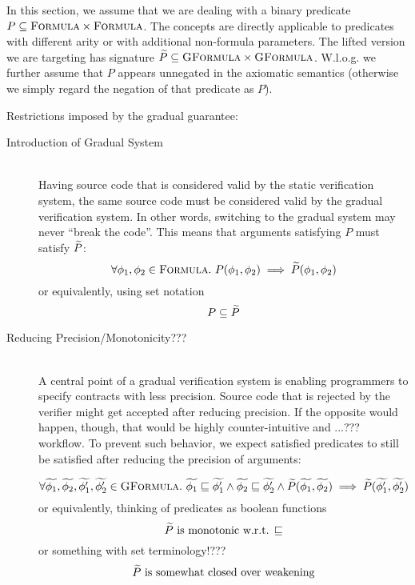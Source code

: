 
In this section, we assume that we are dealing with a binary predicate $P \subseteq \textsc{Formula} \times \textsc{Formula}$.
The concepts are directly applicable to predicates with different arity or with additional non-formula parameters.
The lifted version we are targeting has signature $\widetilde{P} \subseteq \textsc{GFormula} \times \textsc{GFormula}$.
W.l.o.g. we further assume that $P$ appears unnegated in the axiomatic semantics (otherwise we simply regard the negation of that predicate as $P$).

Restrictions imposed by the gradual guarantee:
\begin{description}
    \item[Introduction of Gradual System]~\\
    Having source code that is considered valid by the static verification system, the same source code must be considered valid by the gradual verification system.
    In other words, switching to the gradual system may never “break the code”.
    This means that arguments satisfying $P$ must satisfy $\widetilde{P}$:
    \begin{displaymath}
    \forall \phi_1, \phi_2 \in \textsc{Formula}.~ P(\phi_1, \phi_2) \implies \widetilde{P}(\phi_1, \phi_2)
    \end{displaymath}
    or equivalently, using set notation
    \begin{displaymath}
    P \subseteq \widetilde{P}
    \end{displaymath}
    
    \item[Reducing Precision/Monotonicity???]~\\
    A central point of a gradual verification system is enabling programmers to specify contracts with less precision.
    Source code that is rejected by the verifier might get accepted after reducing precision.
    If the opposite would happen, though, that would be highly counter-intuitive and ...??? workflow.
    To prevent such behavior, we expect satisfied predicates to still be satisfied after reducing the precision of arguments:
    
    \begin{displaymath}
    \forall \widetilde{\phi_1}, \widetilde{\phi_2}, \widetilde{\phi_1'}, \widetilde{\phi_2'} \in \textsc{GFormula}.~ \widetilde{\phi_1} \sqsubseteq \widetilde{\phi_1'} \wedge \widetilde{\phi_2} \sqsubseteq \widetilde{\phi_2'} \wedge \widetilde{P}(\widetilde{\phi_1}, \widetilde{\phi_2}) \implies \widetilde{P}(\widetilde{\phi_1'}, \widetilde{\phi_2'})
    \end{displaymath}
    or equivalently, thinking of predicates as boolean functions
    \begin{displaymath}
    \widetilde{P}  \text{ is monotonic w.r.t. $\sqsubseteq$}
    \end{displaymath}
    or something with set terminology!???
    \begin{displaymath}
    \widetilde{P}  \text{ is somewhat closed over weakening}
    \end{displaymath}
\end{description}

